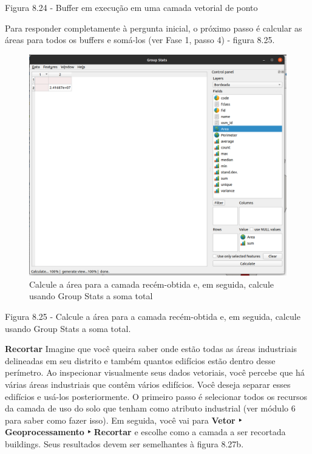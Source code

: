 \documentclass[
]{book}
\begin{document}
Figura 8.24 - Buffer em execução em uma camada vetorial de ponto

Para responder completamente à pergunta inicial, o próximo passo é calcular as áreas para todos os buffers e somá-los (ver Fase 1, passo 4) - figura 8.25.

\begin{figure}
\centering
\includegraphics{media/modulo8/fig825.png}
\caption{Calcule a área para a camada recém-obtida e, em seguida, calcule usando Group Stats a soma total}
\end{figure}

Figura 8.25 - Calcule a área para a camada recém-obtida e, em seguida, calcule usando Group Stats a soma total.

\textbf{Recortar} Imagine que você queira saber onde estão todas as áreas industriais delineadas em seu distrito e também quantos edifícios estão dentro desse perímetro. Ao inspecionar visualmente seus dados vetoriais, você percebe que há várias áreas industriais que contêm vários edifícios. Você deseja separar esses edifícios e usá-los posteriormente. O primeiro passo é selecionar todos os recursos da camada de uso do solo que tenham como atributo industrial (ver módulo 6 para saber como fazer isso). Em seguida, você vai para \textbf{Vetor ‣ Geoprocessamento ‣ Recortar} e escolhe como a camada a ser recortada buildings. Seus resultados devem ser semelhantes à figura 8.27b.
\end{document}
